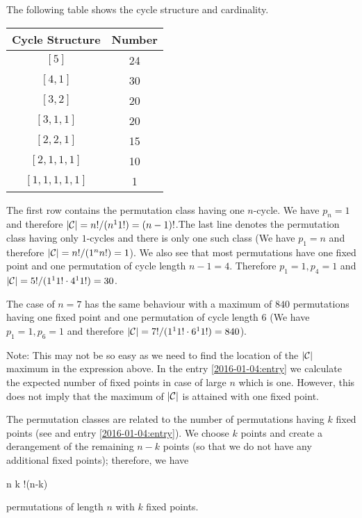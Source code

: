 The following table shows the cycle structure and cardinality.

\vspace{2mm}

\begin{tabular}{cc}
    Cycle Structure & Number \\ \hline
    $[5]$ &  24 \\
    $[4, 1]$ & 30 \\
    $[3, 2]$ & 20 \\
    $[3, 1, 1]$ & 20 \\
    $[2, 2, 1]$ & 15 \\
    $[2, 1, 1, 1]$ & 10 \\
    $[1, 1, 1, 1, 1]$ & 1
\end{tabular}

\vspace{2mm}

The first row contains the permutation class having one $n$-cycle. We have $p_n=1$ and therefore $|\mathcal{C}| = n!/(n^1 1!) = (n-1)!$.The last line denotes the permutation class having only $1$-cycles and there is only one such class (We have $p_1=n$ and therefore $|\mathcal{C}| = n!/(1^n n!) = 1$). We also see that most permutations have one fixed point and one permutation of cycle length $n-1=4$. Therefore $p_1=1, p_{4}=1$ and $|\mathcal{C}| = 5!/(1^1 1! \cdot 4^1 1! ) = 30$.

The case of $n=7$ has the same behaviour with a maximum of $840$ permutations having one fixed point and one permutation of cycle length $6$ (We have $p_1=1, p_6=1$ and therefore $|\mathcal{C}| = 7!/(1^1 1! \cdot 6^1 1!) = 840$).

Note: This may not be so easy as we need to find the location of the $|\mathcal{C}|$ maximum in the expression above. In the entry \ref{2016-01-04:entry} we calculate the expected number of fixed points in case of large $n$ which is one. However, this does not imply that the maximum of $|\mathcal{C}|$ is attained with one fixed point.


 The permutation classes are related to the number of permutations having $k$ fixed points (see \cite{Baez2019} and entry \ref{2016-01-04:entry}). We choose $k$ points and create a derangement of the remaining $n-k$ points (so that we do not have any additional fixed points); therefore, we have

\bee
{n \choose k} !(n-k)
\eee

permutations of length $n$ with $k$ fixed points.

